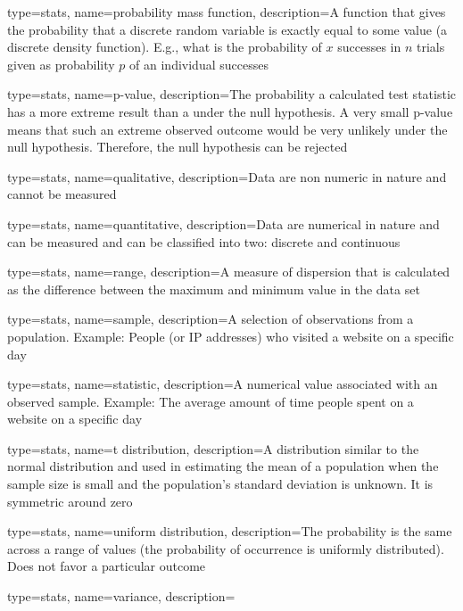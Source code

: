 {
	type=stats,
    name=probability mass function,
    description={A function that gives the probability that a discrete random variable is exactly equal to some value (a discrete density function).  E.g., what is the probability of $x$ successes in $n$ trials given as probability $p$ of an individual successes}
}

{
	type=stats,
    name=p-value,
    description={The probability a calculated test statistic has a more extreme result than a under the null hypothesis.   A very small p-value means that such an extreme observed outcome would be very unlikely under the null hypothesis.  Therefore, the null hypothesis can be rejected}
}

{
	type=stats,
    name=qualitative,
    description={Data are non numeric in nature and cannot be measured}
}

{
	type=stats,
    name=quantitative,
    description={Data are numerical in nature and can be measured and can be classified into two: discrete and continuous}
}

{
	type=stats,
    name=range,
    description={A measure of dispersion that is calculated as the difference between the maximum and minimum value in the data set}
}

{
	type=stats,
    name=sample,
    description={A selection of observations from a population. Example: People (or IP addresses) who visited a website on a specific day}
}

{
	type=stats,
    name=statistic,
    description={A numerical value associated with an observed sample. Example: The average amount of time people spent on a website on a specific day}
}

{
	type=stats,
    name=t distribution,
    description={A distribution similar to the normal distribution and used in estimating the mean of a population when the sample size is small and the population's standard deviation is unknown.  It is symmetric around zero}
}

{
	type=stats,
    name=uniform distribution,
    description={The probability is the same across a range of values (the probability of occurrence is uniformly distributed).  Does not favor a particular outcome}
}

{
	type=stats,
    name=variance,
    description={}
} 